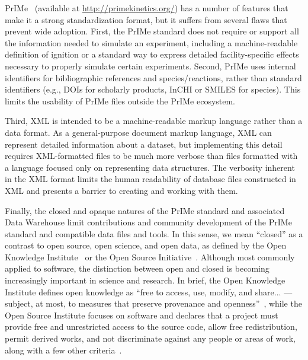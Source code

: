 \documentclass[12pt]{ijck}
\begin{document}
PrIMe~\autocite{Frenklach:2007bm,You:2011hy} (available at \url{http://primekinetics.org/})
has a number of features that make
it a strong standardization format, but it suffers from several flaws that
prevent wide adoption. First, the PrIMe standard does not require or support all
the information needed to simulate an experiment, including a machine-readable
definition of ignition or a standard way to express detailed facility-specific
effects necessary to properly simulate certain experiments. Second, PrIMe uses
internal identifiers for bibliographic references and
species\slash reactions, rather than standard identifiers (e.g., DOIs for
scholarly products, InCHI or SMILES for species). This limits the usability of PrIMe files outside
the PrIMe ecosystem.

Third, XML is intended to be a machine-readable markup language rather than a data format.
As a general-purpose document markup language, XML can represent detailed
information about a dataset, but implementing this detail requires XML-formatted
files to be much more verbose than files formatted with a language focused
only on representing data structures. The verbosity inherent in the XML format
limits the human readability of database files constructed in XML and presents a barrier to
creating and working with them.

Finally, the closed and opaque natures of the PrIMe standard and associated Data Warehouse limit
contributions and community development of the PrIMe standard and compatible data files and tools.
In this sense, we mean ``closed'' as a contrast to open source, open science, and open data, as
defined by the Open Knowledge Institute~\cite{openknowledge} or the Open Source
Initiative~\cite{opensource}. Although most commonly applied to software, the distinction between
open and closed is becoming increasingly important in science and research. In brief, the Open
Knowledge Institute defines open knowledge as ``free to access, use, modify, and share... — subject,
at most, to measures that preserve provenance and openness''~\cite{openknowledge}, while the Open
Source Institute focuses on software and declares that a project must provide free and unrestricted
access to the source code, allow free redistribution, permit derived works, and not discriminate
against any people or areas of work, along with a few other criteria~\cite{opensource}.
\end{document}
